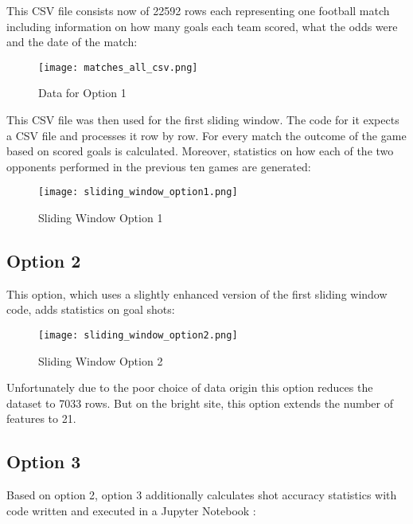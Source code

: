 This CSV file consists now of 22592 rows each representing one football match including information on how many goals each team scored, what the odds were and the date of the match:

\begin{figure}[H]
\begin{center}
\texttt{[image: matches\_all\_csv.png]}
\end{center}
\caption{Data for Option 1}
\label{fig:matches_all_csv}
\end{figure}


This CSV file was then used for the first sliding window. The code for it \cite{sliding01} expects a CSV file and processes it row by row. For every match the outcome of the game based on scored goals is calculated. Moreover, statistics on how each of the two opponents performed in the previous ten games are generated:

\begin{figure}[H]
\begin{center}
\texttt{[image: sliding\_window\_option1.png]}
\end{center}
\caption{Sliding Window Option 1}
\label{fig:sliding_window_option1}
\end{figure}


\subsection {Option 2}
This option, which uses a slightly enhanced version \cite{sliding02} of the first sliding window code, adds statistics on goal shots:

\begin{figure}[H]
\begin{center}
\texttt{[image: sliding\_window\_option2.png]}
\end{center}
\caption{Sliding Window Option 2}
\label{fig:sliding_window_option2}
\end{figure}

Unfortunately due to the poor choice of data origin this option reduces the dataset to 7033 rows. But on the bright site, this option extends the number of features to 21.

\subsection {Option 3}
Based on option 2, option 3 additionally calculates shot accuracy statistics with code written and executed in a Jupyter Notebook \cite{jupyter_sliding}:

